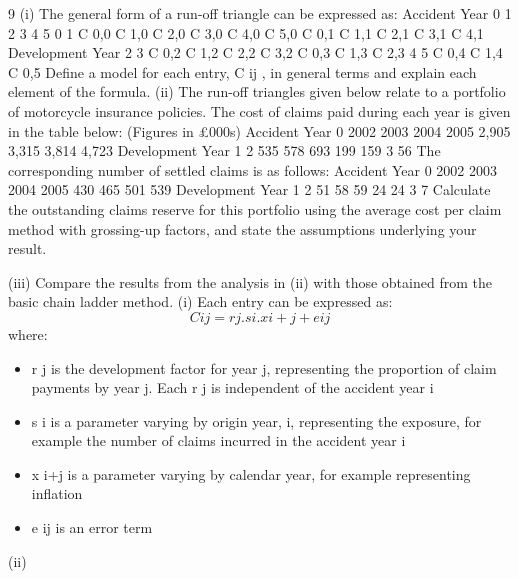 \documentclass[a4paper,12pt]{article}
\begin{document}
\begin{enumerate}
9
(i)
The general form of a run-off triangle can be expressed as:
Accident
Year
0
1
2
3
4
5
0 1
C 0,0
C 1,0
C 2,0
C 3,0
C 4,0
C 5,0 C 0,1
C 1,1
C 2,1
C 3,1
C 4,1
Development Year
2
3
C 0,2
C 1,2
C 2,2
C 3,2
C 0,3
C 1,3
C 2,3
4 5
C 0,4
C 1,4 C 0,5
Define a model for each entry, C ij , in general terms and explain each element of the formula.
(ii)
The run-off triangles given below relate to a portfolio of motorcycle insurance policies.
The cost of claims paid during each year is given in the table below:
(Figures in £000s)
Accident
Year
0
2002
2003
2004
2005
2,905
3,315
3,814
4,723
Development Year
1
2
535
578
693
199
159
3
56
The corresponding number of settled claims is as follows:
Accident
Year
0
2002
2003
2004
2005
430
465
501
539
Development Year
1
2
51
58
59
24
24
3
7
Calculate the outstanding claims reserve for this portfolio using the average cost per claim method with grossing-up factors, and state the assumptions underlying your result.

(iii)
Compare the results from the analysis in (ii) with those obtained from the basic chain ladder method.
(i)
Each entry can be expressed as:
\[C ij = r j . s i . x i+j + e ij\]
where:
\begin{itemize}
\item r j is the development factor for year j, representing the proportion of claim payments by year j. Each r j is independent of the accident year i
\item s i is a parameter varying by origin year, i, representing the exposure, for example the number of claims incurred in the accident year i
\item x i+j is a parameter varying by calendar year, for example representing inflation
\item e ij is an error term
\end{itemize}
(ii)


\end{enumerate}
\end{document}
